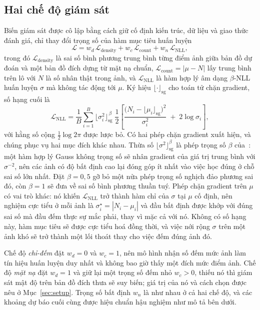 \documentclass[preprint,12pt]{elsarticle}
\begin{document}
\subsection{Hai chế độ giám sát}
Biến giám sát được cô lập bằng cách giữ cố định kiến trúc, dữ liệu và giao thức đánh giá, chỉ thay đổi trọng số
của hàm mục tiêu huấn luyện
\begin{equation}
\mathcal{L} = w_d\,\mathcal{L}_{\text{density}} + w_c\,\mathcal{L}_{\text{count}}
+ w_{n}\,\mathcal{L}_{\text{NLL}},
\end{equation}
trong đó $\mathcal{L}_{\text{density}}$ là sai số bình phương trung bình từng điểm ảnh giữa bản đồ dự đoán và một
bản đồ đích dựng từ mặt nạ chuẩn, $\mathcal{L}_{\text{count}} = |\mu - N|$ lấy trung bình trên lô với $N$ là số
nhân thật trong ảnh, và $\mathcal{L}_{\text{NLL}}$ là hàm hợp lý âm dạng $\beta$-NLL~\cite{bnll} huấn luyện
$\sigma$ mà không tác động tới $\mu$. Ký hiệu $\lfloor\cdot\rfloor_{\text{sg}}$ cho toán tử chặn gradient, số hạng
cuối là
\begin{equation}
\mathcal{L}_{\text{NLL}}
= \frac{1}{B}\sum_{i=1}^{B}
\big\lfloor \sigma_i^{2}\big\rfloor_{\text{sg}}^{\,\beta}\;
\frac{1}{2}\!\left[
\frac{\big(N_i - \lfloor\mu_i\rfloor_{\text{sg}}\big)^{2}}{\sigma_i^{2}}
\;+\; 2\log\sigma_i
\right],
\end{equation}
với hằng số cộng $\tfrac{1}{2}\log 2\pi$ được lược bỏ. Có hai phép chặn gradient xuất hiện, và chúng phục vụ hai
mục đích khác nhau. Thừa số $\lfloor\sigma^{2}\rfloor_{\text{sg}}^{\beta}$ là phép trọng số $\beta$
của~\cite{bnll}: một hàm hợp lý Gauss không trọng số sẽ nhân gradient của giá trị trung bình với $\sigma^{-2}$,
nên các ảnh có độ bất định cao lại đóng góp ít nhất vào việc học đúng ở chỗ sai số lớn nhất. Đặt $\beta = 0{,}5$
gỡ bỏ một nửa phép trọng số nghịch đảo phương sai đó, còn $\beta = 1$ sẽ đưa về sai số bình phương thuần tuý.
Phép chặn gradient trên $\mu$ có vai trò khác: nó khiến $\mathcal{L}_{\text{NLL}}$ trở thành hàm chỉ của $\sigma$
tại $\mu$ cố định, nên nghiệm cực tiểu ở mỗi ảnh là $\sigma_i^{\star} = |N_i - \mu_i|$ và đầu bất định được khớp
với đúng sai số mà đầu đếm thực sự mắc phải, thay vì mặc cả với nó. Không có số hạng này, hàm mục tiêu sẽ được
cực tiểu hoá đồng thời, và việc nới rộng $\sigma$ trên một ảnh khó sẽ trở thành một lối thoát thay cho việc đếm
đúng ảnh đó.

Chế độ \emph{chỉ-đếm} đặt $w_d = 0$ và $w_c = 1$, nên mô hình nhận số đếm mức ảnh làm tín hiệu huấn luyện duy nhất
và không bao giờ thấy một đích mức điểm ảnh. Chế độ \emph{mặt nạ} đặt $w_d = 1$ và giữ lại một trọng số đếm nhỏ
$w_c > 0$, thiếu nó thì giám sát mật độ trên bản đồ đích thưa sẽ suy biến; giá trị của nó và cách chọn được nêu ở
Mục~\ref{sec:setup}. Trọng số bất định $w_n$ là như nhau ở cả hai chế độ, và các khoảng dự báo cuối cùng được hiệu
chuẩn hậu nghiệm như mô tả bên dưới.
\end{document}

